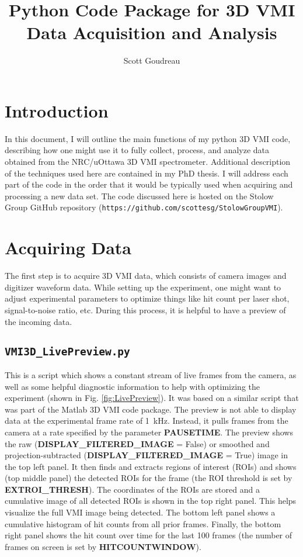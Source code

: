 \documentclass[12pt]{article}
\title{Python Code Package for 3D VMI \\ Data Acquisition and Analysis \\ \version}
\author{Scott Goudreau}
\begin{document}
\maketitle

\section{Introduction}

In this document, I will outline the main functions of my python 3D VMI code, describing how one might use it to fully collect, process, and analyze data obtained from the NRC/uOttawa 3D VMI spectrometer.
Additional description of the techniques used here are contained in my PhD thesis.
I will address each part of the code in the order that it would be typically used when acquiring and processing a new data set.
The code discussed here is hosted on the Stolow Group GitHub repository (\texttt{https://github.com/scottesg/StolowGroupVMI}).

\section{Acquiring Data}

The first step is to acquire 3D VMI data, which consists of camera images and digitizer waveform data.
While setting up the experiment, one might want to adjust experimental parameters to optimize things like hit count per laser shot, signal-to-noise ratio, etc.
During this process, it is helpful to have a preview of the incoming data.

\subsection{\texttt{VMI3D\_LivePreview.py}} 

This is a script which shows a constant stream of live frames from the camera, as well as some helpful diagnostic information to help with optimizing the experiment (shown in Fig. \ref{fig:LivePreview}).
It was based on a similar script that was part of the Matlab 3D VMI code package.
The preview is not able to display data at the experimental frame rate of 1~kHz.
Instead, it pulls frames from the camera at a rate specified by the parameter \textbf{PAUSETIME}.
The preview shows the raw (\textbf{DISPLAY\_FILTERED\_IMAGE} = False) or smoothed and projection-subtracted (\textbf{DISPLAY\_FILTERED\_IMAGE} = True) image in the top left panel.
It then finds and extracts regions of interest (ROIs) and shows (top middle panel) the detected ROIs for the frame (the ROI threshold is set by \textbf{EXTROI\_THRESH}).
The coordinates of the ROIs are stored and a cumulative image of all detected ROIs is shown in the top right panel.
This helps visualize the full VMI image being detected.
The bottom left panel shows a cumulative histogram of hit counts from all prior frames.
Finally, the bottom right panel shows the hit count over time for the last 100 frames (the number of frames on screen is set by \textbf{HITCOUNTWINDOW}).
\end{document}
